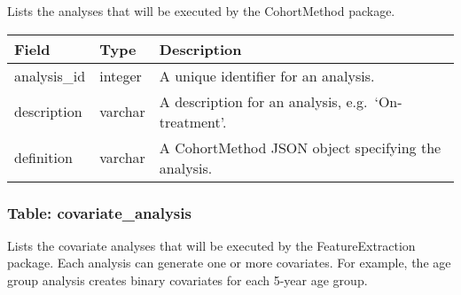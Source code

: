 \documentclass[
]{article}
\begin{document}
Lists the analyses that will be executed by the CohortMethod package.

\begin{longtable}[]{@{}lll@{}}
\toprule
Field & Type & Description\tabularnewline
\midrule
\endhead
analysis\_id & integer & A unique identifier for an
analysis.\tabularnewline
description & varchar & A description for an analysis,
e.g.~`On-treatment'.\tabularnewline
definition & varchar & A CohortMethod JSON object specifying the
analysis.\tabularnewline
\bottomrule
\end{longtable}

\hypertarget{table-covariate_analysis}{%
\subsubsection{Table:
covariate\_analysis}\label{table-covariate_analysis}}

Lists the covariate analyses that will be executed by the
FeatureExtraction package. Each analysis can generate one or more
covariates. For example, the age group analysis creates binary
covariates for each 5-year age group.
\end{document}
